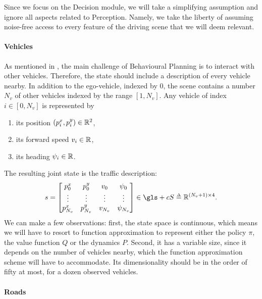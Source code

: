 Since we focus on the Decision module, we will take a simplifying assumption and ignore all aspects related to Perception.
Namely, we take the liberty of assuming noise-free access to every feature of the driving scene that we will deem relevant.

\paragraph{Vehicles}

As mentioned in , the main challenge of Behavioural Planning is to interact with other vehicles. Therefore, the state should include a description of every vehicle nearby. In addition to the ego-vehicle, indexed by 0, the scene contains a number $N_v$ of other vehicles indexed by the range $[1, N_v]$.
Any vehicle of index $i\in[0,N_v]$ is represented by 
\begin{enumerate}[label=(\roman*)]
	\item its position $(p^x_{i}, p^y_{i})\in\mathbb{R}^2$,
	\item its forward speed $v_i\in\mathbb{R}$, 
	\item its heading $\psi_i\in\mathbb{R}$.
\end{enumerate}

The resulting joint state is the traffic description: 
\begin{equation}
\label{eq:state-space}
s = \begin{bmatrix}
p^x_{0} & p^y_{0} & v_0 & \psi_0\\
\vdots & \vdots & \vdots & \vdots\\
p^x_{{N_v}} & p^y_{{N_v}} & v_{N_v} & \psi_{N_v}\\
\end{bmatrix}
\in\gls+{cS} \eqdef\Real^{(N_v+1) \times 4}.
\end{equation}
We can make a few observations: first, the state space is continuous, which means we will have to resort to function approximation to represent either the policy $\pi$, the value function $Q$ or the dynamics $P$. Second, it has a variable size, since it depends on the number of vehicles nearby, which the function approximation scheme will have to accommodate. Its dimensionality should be in the order of fifty at most, for a dozen observed vehicles.

\paragraph{Roads}


